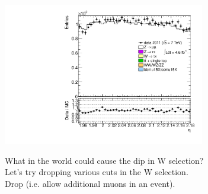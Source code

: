 {\includegraphics[width=0.66\textwidth]{dates/20130306/figures/both/Znowind_10_A_stack_lN_eta_ALL.pdf} 
\cole
}


 {
What in the world could cause the dip in W selection? \\
Let's try dropping various cuts in the W selection. \\
Drop  (i.e. allow additional muons in an event).
}
